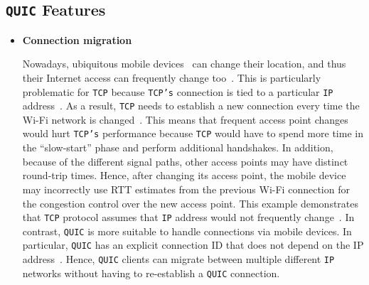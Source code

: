 \documentclass[12pt,a4paper]{report}
\begin{document}
\subsection{\texttt{QUIC} Features} \label{QUIC_features}
\begin{itemize}


 \item \textbf{Connection migration} 
 
    Nowadays, ubiquitous mobile devices~\cite{bib_number_of_mobile_users} can change their location, and thus their Internet access can frequently change too~\cite{PollardBarry2019HiAP}.
    This is particularly problematic for \texttt{TCP} because \texttt{TCP's} connection is tied to a particular \texttt{IP} address~\cite{PollardBarry2019HiAP}.
    As a result, \texttt{TCP} needs to establish a new connection every time the Wi-Fi network is changed~\cite{PollardBarry2019HiAP}.
    This means that frequent access point changes would hurt \texttt{TCP's} performance because \texttt{TCP} would have to spend more time in the \enquote{slow-start} phase and perform additional handshakes.
    In addition, because of the different signal paths, other access points may have distinct round-trip times.
    Hence, after changing its access point, the mobile device may incorrectly use RTT estimates from the previous Wi-Fi connection for the congestion control over the new access point.
    This example demonstrates that \texttt{TCP} protocol assumes that \texttt{IP} address would not frequently change~\cite{PollardBarry2019HiAP}.
    In contrast, \texttt{QUIC} is more suitable to handle connections via mobile devices.
    In particular, \texttt{QUIC} has an explicit connection ID that does not depend on the IP address~\cite{PollardBarry2019HiAP}.
    Hence, \texttt{QUIC} clients can migrate between multiple different \texttt{IP} networks without having to re-establish a \texttt{QUIC} connection.
    
    
    






\end{itemize}
\end{document}
